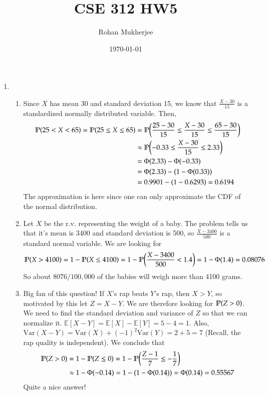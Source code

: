 \documentclass[12pt]{article}
\title{CSE 312 HW5}
\date{\today}
\author{Rohan Mukherjee}
\renewcommand{\P}{\mathbb{P}\qty}
\newcommand{\E}{\mathbb{E}}
\newcommand{\Var}{\mathrm{Var}}
\begin{document}
	\maketitle
	\begin{enumerate}[leftmargin=\labelsep]
		\item \begin{enumerate}
			Note: throughout this problem, I put $\approx$ signs since the value of $\Phi$'s are not exact (and, I might plug in a rounded value into $\phi$).
			\item 
			Since $X$ has mean 30 and standard deviation 15, we know that $\frac{X-30}{15}$ is a standardized normally distributed variable. Then,
			\begin{align*}
				\P(25 < X < 65) = \P(25 \leq X \leq 65) &= \P(\frac{25-30}{15} \leq \frac{X-30}{15} \leq \frac{65-30}{15}) \\
				&\approx \P(-0.33 \leq \frac{X-30}{15} \leq 2.33) \\
				&= \Phi(2.33) - \Phi(-0.33) \\
				&= \Phi(2.33) - (1 - \Phi(0.33)) \\
				&= 0.9901 - (1 - 0.6293) = 0.6194
			\end{align*}
			The approximation is here since one can only approximate the CDF of the normal distribution.
		
			\item Let $X$ be the r.v. representing the weight of a baby. The problem tells us that it's mean is 3400 and standard deviation is  500, so $\frac{X-3400}{500}$ is a standard normal variable. We are looking for
			\begin{align*}
				\P(X > 4100) = 1 - \P(X \leq 4100) = 1 - \P(\frac{X-3400}{500} < 1.4) = 1 - \Phi(1.4) = 0.08076
			\end{align*}
			So about $8076/100,000$ of the babies will weigh more than 4100 grams.
		
			\item Big fan of this question! If $X$'s rap beats $Y$'s rap, then $X > Y$, so motivated by this let $Z = X - Y$. We are therefore looking for $\P(Z > 0)$. We need to find the standard deviation and variance of $Z$ so that we can normalize it. $\E[X-Y] = \E[X] - \E[Y] = 5 - 4 = 1$. Also, $\Var(X-Y) = \Var(X) + (-1)^2\Var(Y) = 2+5 = 7$ (Recall, the rap quality is independent). We conclude that
			\begin{align*}
				\P(Z > 0) &= 1 - \P(Z \leq 0) = 1 - \P(\frac{Z-1}{7} \leq -\frac17) 
				\\&\approx 1 - \Phi(-0.14) = 1 - (1 - \Phi(0.14)) = \Phi(0.14) = 0.55567
			\end{align*}
			Quite a nice answer!
			\end{enumerate}
			

\end{enumerate}
\end{document}
